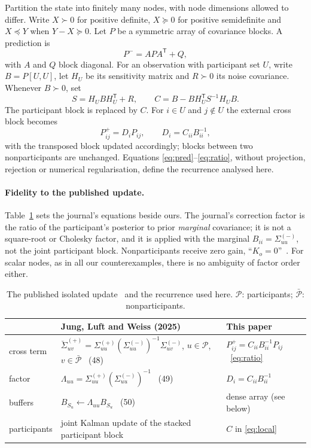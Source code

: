 \documentclass[11pt,a4paper]{article}
\numberwithin{equation}{section}
\theoremstyle{remark}\newtheorem{remark}[theorem]{Remark}
\newcommand{\T}{^{\mathsf T}}
\begin{document}
Partition the state into finitely many nodes, with node dimensions allowed to differ. Write
$X\succ0$ for positive definite, $X\succeq0$ for positive semidefinite and $X\preceq Y$ when
$Y-X\succeq0$. Let $P$ be a symmetric array of covariance blocks. A prediction is
\begin{equation}\label{eq:pred}
P^- = A P A\T + Q,
\end{equation}
with $A$ and $Q$ block diagonal. For an observation with participant set $U$, write
$B=P[U,U]$, let $H_U$ be its sensitivity matrix and $R\succ0$ its noise covariance. Whenever
$B\succ0$, set
\begin{equation}\label{eq:local}
S=H_U B H_U\T+R,\qquad C=B-BH_U\T S^{-1}H_U B .
\end{equation}
The participant block is replaced by $C$. For $i\in U$ and $j\notin U$ the external cross block
becomes
\begin{equation}\label{eq:ratio}
P_{ij}^{+}=D_iP_{ij},\qquad D_i=C_{ii}B_{ii}^{-1},
\end{equation}
with the transposed block updated accordingly; blocks between two nonparticipants are
unchanged. Equations \eqref{eq:pred}--\eqref{eq:ratio}, without projection, rejection or
numerical regularisation, define the recurrence analysed here.

\paragraph{Fidelity to the published update.} Table~\ref{tab:fidelity} sets the journal's
equations beside ours. The journal's correction factor is the ratio of the participant's
posterior to prior \emph{marginal} covariance; it is not a square-root or Cholesky factor, and
it is applied with the marginal $B_{ii}=\Sigma_{uu}^{(-)}$, not the joint participant block.
Nonparticipants receive zero gain, ``$K_o=0$''~\citep{JungLuftWeiss2025}. For scalar nodes,
as in all our counterexamples, there is no ambiguity of factor order either.

\begin{table}[ht]
\centering\small
\caption{The published isolated update~\citep[eqs.~(47)--(50)]{JungLuftWeiss2025} and the
recurrence used here. $\mathcal P$: participants; $\bar{\mathcal P}$: nonparticipants.}
\label{tab:fidelity}
\begin{tabular}{@{}lll@{}}
\toprule
& Jung, Luft and Weiss (2025) & This paper\\
\midrule
cross term & $\breve\Sigma_{uv}^{(+)}=\Sigma_{uu}^{(+)}(\Sigma_{uu}^{(-)})^{-1}\Sigma_{uv}^{(-)}$, $u\in\mathcal P$, $v\in\bar{\mathcal P}$ \ (48) & $P_{ij}^+=C_{ii}B_{ii}^{-1}P_{ij}$ \ \eqref{eq:ratio}\\
factor & $\Lambda_{uu}=\Sigma_{uu}^{(+)}(\Sigma_{uu}^{(-)})^{-1}$ \ (49) & $D_i=C_{ii}B_{ii}^{-1}$\\
buffers & $B_{S_u}\leftarrow\Lambda_{uu}B_{S_u}$ \ (50) & dense array (see below)\\
participants & joint Kalman update of the stacked participant block & $C$ in \eqref{eq:local}\\
\bottomrule
\end{tabular}
\end{table}
\end{document}
